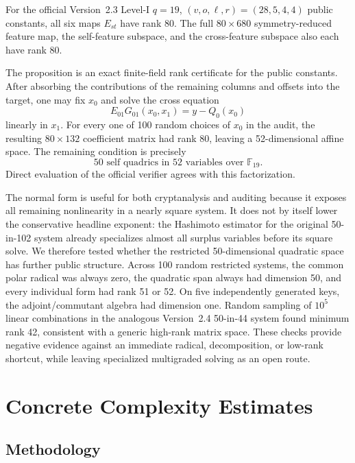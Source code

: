 \documentclass[runningheads]{llncs}
\newcommand{\F}{\mathbb F}
\begin{document}
\begin{proposition}\label{prop:crosspair}
For the official Version~2.3 Level-I $q=19$, $(v,o,\ell,r)=(28,5,4,4)$ public constants, all six maps $E_{st}$ have rank 80.  The full $80\times680$ symmetry-reduced feature map, the self-feature subspace, and the cross-feature subspace also each have rank 80.
\end{proposition}

The proposition is an exact finite-field rank certificate for the public constants.  After absorbing the contributions of the remaining columns and offsets into the target, one may fix $x_0$ and solve the cross equation
\[
 E_{01}G_{01}(x_0,x_1)=y-Q_0(x_0)
\]
linearly in $x_1$.  For every one of 100 random choices of $x_0$ in the audit, the resulting $80\times132$ coefficient matrix had rank 80, leaving a 52-dimensional affine space.  The remaining condition is precisely
\[
 \boxed{50\text{ self quadrics in }52\text{ variables over }\F_{19}.}
\]
Direct evaluation of the official verifier agrees with this factorization.

The normal form is useful for both cryptanalysis and auditing because it exposes all remaining nonlinearity in a nearly square system.  It does not by itself lower the conservative headline exponent: the Hashimoto estimator for the original 50-in-102 system already specializes almost all surplus variables before its square solve.  We therefore tested whether the restricted 50-dimensional quadratic space has further public structure.  Across 100 random restricted systems, the common polar radical was always zero, the quadratic span always had dimension 50, and every individual form had rank 51 or 52.  On five independently generated keys, the adjoint/commutant algebra had dimension one.  Random sampling of $10^5$ linear combinations in the analogous Version~2.4 50-in-44 system found minimum rank 42, consistent with a generic high-rank matrix space.  These checks provide negative evidence against an immediate radical, decomposition, or low-rank shortcut, while leaving specialized multigraded solving as an open route.

\section{Concrete Complexity Estimates}\label{sec:complexity}

\subsection{Methodology}
\end{document}
